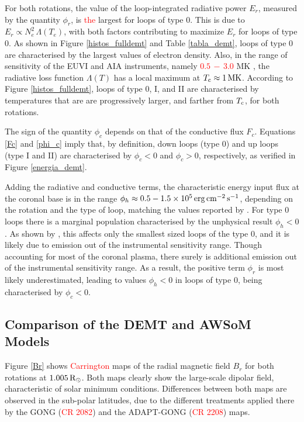 \documentclass[namedreferences]{solarphysics}
\def\edit#1{\textcolor{Red}{#1}}
\newcommand{\mrsun}{{\rm R_\odot}}
\newcommand{\MK}{{\rm MK}}
\newcommand{\cm}{{\rm cm}}
\newcommand{\cminvs}{\cm^{-2}}
\newcommand{\erg}{{\rm erg}}
\newcommand{\s}{{\rm s}}
\newcommand{\Tc}{T_{\rm c}}
\begin{document}
\begin{article}
{For both rotations, the value of the {loop-integrated} radiative power $E_r$, measured by the quantity $\phi_r$, is \edit{the} largest for loops of type 0. This is due to $E_r\propto N_e^2\,\Lambda(T_e)$, with both factors contributing to maximize $E_r$ for loops of type 0. As shown in Figure \ref{histos_fulldemt} and Table \ref{tabla_demt}, loops of type 0 are {characterised} by {the largest} values of electron density. Also, in the range of sensitivity of the EUVI and AIA instruments, namely \edit{$0.5\,-\,3.0$} MK \citep{nuevo_2015}, the radiative loss function $\Lambda(T)$ has a local maximum at $\Tc\approx 1\,\MK$. According to Figure \ref{histos_fulldemt}, loops of type 0, I, and II are {characterised by temperatures that are are progressively larger, and farther from $\Tc$, for both rotations.}}

The sign of the quantity $\phi_c$ depends on that of the conductive flux $F_c$. Equations \ref{Fc} and \ref{phi_c} imply that, by definition, down loops (type 0) and up loops (type I and II) are characterised by $\phi_c<0$ and $\phi_c>0$, respectively, {as verified} in Figure \ref{energia_demt}.

{{Adding the} radiative and conductive terms, the characteristic energy input flux at the coronal base is in the range $\phi_h\approx 0.5-1.5 \times 10^5\,\erg\,\cminvs\,\s^{-1}$, depending on the rotation and the type of {loop, matching the values reported by} \citet{maccormack_2017}. {For} type 0 loops there is a marginal population characterised by the unphysical result $\phi_h<0$. As shown by \citet{maccormack_2017}, this affects only the smallest sized loops of the type 0, and it is likely due {to emission out of the instrumental sensitivity range}. Though accounting for most of the coronal plasma, there surely is additional emission out of the instrumental sensitivity range. As a result,} the positive term $\phi_r$ is most likely underestimated, leading to values $\phi_h<0$ in loops of type 0, {being characterised by $\phi_c<0$.}

\subsection{{Comparison of the DEMT and AWSoM Models}}\label{awsom_res} 

{Figure \ref{Br} shows \edit{Carrington} maps of {the radial} magnetic {field $B_r$} for both rotations at $1.005\, \mrsun$. {Both maps clearly show the large-scale dipolar field, characteristic of solar minimum conditions. Differences between both maps are observed in the sub-polar latitudes, due to the different treatments applied there by the GONG (\edit{CR 2082}) and the ADAPT-GONG (\edit{CR 2208}) maps.}}


\end{article}
\end{document}
